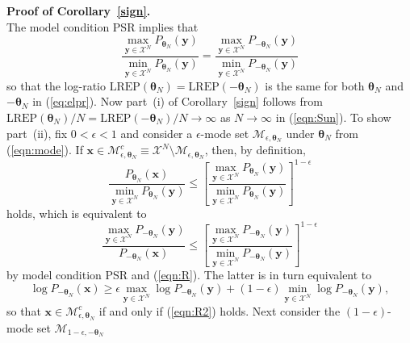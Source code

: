 \documentclass[12pt]{article}
\theoremstyle{definition}
\newcommand{\REP}{\mathrm{LREP}}
\begin{document}
\noindent\textbf{Proof of Corollary~\ref{sign}.}\\
The model condition PSR implies that
\begin{equation}
\label{eqn:R}
  \frac{\max_{\boldsymbol y \in \mathcal{X}^N}P_{\boldsymbol \theta_N}(\boldsymbol y)  }{\min_{\boldsymbol y \in \mathcal{X}^N}P_{\boldsymbol \theta_N}(\boldsymbol y) } =   \frac{\max_{\boldsymbol y \in \mathcal{X}^N}P_{-\boldsymbol \theta_N}(\boldsymbol y)  }{\min_{\boldsymbol y \in \mathcal{X}^N}P_{-\boldsymbol \theta_N}(\boldsymbol y) }
\end{equation}
so that the log-ratio $\REP(\boldsymbol \theta_N)=\REP(-\boldsymbol \theta_N)$ is the same for both $\boldsymbol \theta_N$ and $-\boldsymbol \theta_N$ in (\ref{eq:elpr}).  Now part~(i) of  Corollary~\ref{sign} follows from $\REP(\boldsymbol \theta_N)/N=\REP(-\boldsymbol \theta_N)/N\to \infty$ as $N\to \infty$ in (\ref{eqn:Sun}).  To show part~(ii), fix $0 < \epsilon < 1$ and consider a $\epsilon$-mode set
$\mathcal{M}_{\epsilon, \boldsymbol \theta_N}$ under $\boldsymbol \theta_N$ from (\ref{eqn:mode}).  If $\boldsymbol x \in \mathcal{M}_{\epsilon, \boldsymbol \theta_N}^c \equiv \mathcal{X}^N \setminus \mathcal{M}_{\epsilon, \boldsymbol \theta_N}$, then, by definition,
\[
   \frac{P_{\boldsymbol \theta_N}(\boldsymbol x)}{\min_{\boldsymbol y \in \mathcal{X}^N}P_{\boldsymbol \theta_N}(\boldsymbol y)} \leq \left[\frac{\max_{\boldsymbol y \in \mathcal{X}^N}P_{\boldsymbol \theta_N}(\boldsymbol y)  }{\min_{\boldsymbol y \in \mathcal{X}^N}P_{\boldsymbol \theta_N}(\boldsymbol y) } \right]^{1-\epsilon}
\]
holds, which is equivalent to
\[
      \frac{\max_{\boldsymbol y \in \mathcal{X}^N}P_{-\boldsymbol \theta_N}(\boldsymbol y)}{P_{-\boldsymbol \theta_N}(\boldsymbol x)} \leq
        \left[\frac{\max_{\boldsymbol y \in \mathcal{X}^N}P_{-\boldsymbol \theta_N}(\boldsymbol y)  }{\min_{\boldsymbol y \in \mathcal{X}^N}P_{-\boldsymbol \theta_N}(\boldsymbol y) } \right]^{1-\epsilon}
\]
by model condition PSR and (\ref{eqn:R}).  The latter is in turn equivalent to
\begin{equation}
\label{eqn:R2}\log P_{-\boldsymbol \theta_N}(\boldsymbol x) \geq    \epsilon \max\limits_{\boldsymbol y \in \mathcal{X}^N} \log  P_{-\boldsymbol \theta_N}(\boldsymbol y) + (1-\epsilon)\min\limits_{\boldsymbol y \in \mathcal{X}^N} \log P_{-\boldsymbol \theta_N}(\boldsymbol y),
\end{equation}
so that $\boldsymbol x \in \mathcal{M}_{\epsilon, \boldsymbol \theta_N}^c $ if and only if (\ref{eqn:R2}) holds.
Next consider the $(1-\epsilon)$-mode set $\mathcal{M}_{1-\epsilon, -\boldsymbol \theta_N}$
\end{document}
